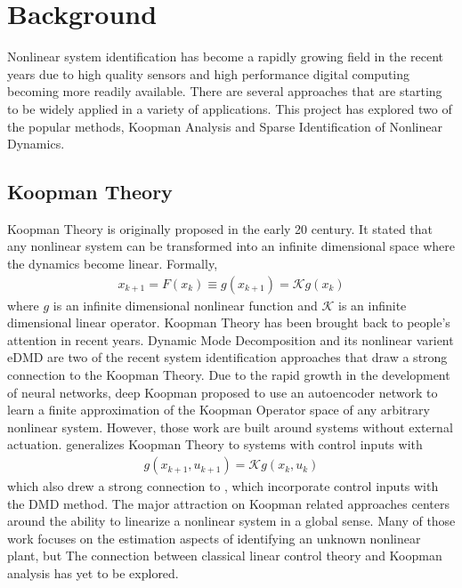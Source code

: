 \documentclass[10pt,twocolumn]{article}
\begin{document}
\section{Background}

Nonlinear system identification has become a rapidly growing field in the recent years due to
high quality sensors and high performance digital computing becoming more readily available.
There are several approaches that are starting to be widely applied in a variety of applications.
This project has explored two of the popular methods, Koopman Analysis and Sparse
Identification of Nonlinear Dynamics.

\subsection{Koopman Theory}
Koopman Theory is originally proposed in the early 20 century. It stated that any nonlinear
system can be transformed into an infinite dimensional space where the dynamics become
linear. Formally,
\begin{gather}\label{eqa:koopman}
  x_{k+1} = F(x_k) \equiv
  g(x_{k+1}) = \mathcal{K} g(x_k)
\end{gather}
where $g$ is an infinite dimensional nonlinear function and $\mathcal{K}$ is an
infinite dimensional linear operator. Koopman Theory has been brought back to people's
attention in recent years. Dynamic Mode Decomposition \cite{dmd} and its nonlinear
varient eDMD \cite{edmd} are two of the recent system identification approaches that
draw a strong connection to the Koopman Theory. Due to the rapid growth in the development
of neural networks, deep Koopman \cite{deepkoopman} proposed to use an autoencoder network to learn
a finite approximation of the Koopman Operator space of any arbitrary nonlinear system.
However, those work are built around systems without external actuation. \cite{generalkoopman}
generalizes Koopman Theory to systems with control inputs with
\begin{gather}\label{eqa:koopman_ctrl}
  g(x_{k+1}, u_{k+1}) = \mathcal{K}g(x_k, u_k)
\end{gather}
which also drew a strong connection to \cite{dmdc}, which incorporate control inputs with the
DMD method. The major attraction on Koopman related approaches centers around the ability
to linearize a nonlinear system in a global sense. Many of those work focuses on the estimation
aspects of identifying an unknown nonlinear plant, but The connection between classical
linear control theory and Koopman analysis has yet to be explored.
\end{document}
